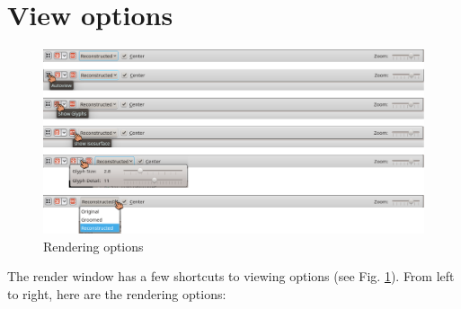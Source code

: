 \documentclass[letterpaper,12pt]{article}   %
\begin{document}
\section{View options}

\begin{figure}[!htp]
\centering
\includegraphics[width=1\textwidth]{figs_v2/render.png}
\caption{Rendering options}
\label{fig:render}
\end{figure}

The render window has a few shortcuts to viewing options (see Fig. \ref{fig:render}). From left to right, here are the rendering options:
\end{document}
